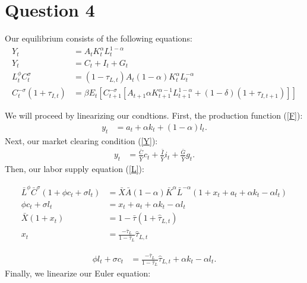 \documentclass[11pt]{article} %
\begin{document}
\section{Question 4}
Our equilibrium consists of the following equations:
\begin{align}
Y_{t} &= A_tK_t^{\alpha}L_t^{1-\alpha} \label{F}\\
Y_{t} &= C_{t} + I_{t} + G_{t} \label{Y}\\
L_{t}^{\phi}C_t^{\sigma} &= (1-\tau_{L,t})A_t(1-\alpha) K_t^{\alpha}L_t^{-\alpha} \label{L}\\
C_t^{-\sigma}(1+\tau_{I,t}) &= \beta E_t[C_{t+1}^{-\sigma}[A_{t+1}\alpha K_{t+1}^{\alpha-1}L_{t+1}^{1-\alpha} + (1-\delta)(1+\tau_{I,t+1})]] \label{EE}
\end{align}

We will proceed by linearizing our condtions. First, the production function (\ref{F}):
\begin{align}
y_t &= a_t + \alpha k_t + (1-\alpha) l_t. \label{f}
\end{align}
Next, our market clearing condition (\ref{Y}):
\begin{align}
y_t &= \frac{\bar{C}}{\bar{Y}}c_t + \frac{\bar{I}}{\bar{Y}} i_t + \frac{\bar{G}}{\bar{Y}} g_t. \label{y}
\end{align}
Then, our labor supply equation (\ref{L}):

\begin{align*}
\bar{L}^{\phi}\bar{C}^{\sigma}(1+\phi c_t + \sigma l_t) &= \bar{X} \bar{A}(1-\alpha) \bar{K}^{\alpha}\bar{L}^{-\alpha}(1+x_t + a_t + \alpha k_t - \alpha l_t) \\
\phi c_t + \sigma l_t &= x_t + a_t + \alpha k_t - \alpha l_t\\
\bar{X}(1+x_t) &= 1-\bar{\tau}(1+\hat{\tau}_{L,t})\\
x_t &= \frac{-\bar{\tau}_L}{1-\bar{\tau}_L} \hat{\tau}_{L,t}
\end{align*}

\begin{align}
\phi l_t + \sigma c_t &= \frac{-\bar{\tau}_{L}}{1-\bar{\tau}_{L}}\hat{\tau}_{L,t}+\alpha k_t -\alpha l_t. \label{l}
\end{align}
Finally, we linearize our Euler equation:
\end{document}
